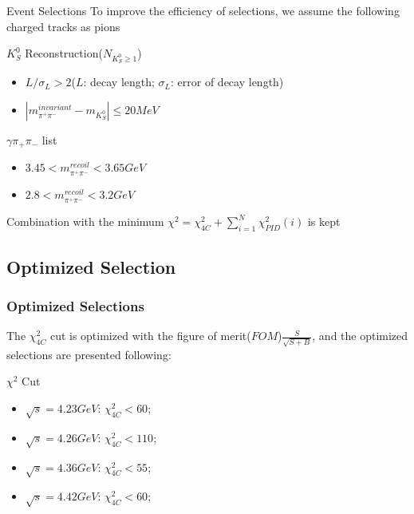 \documentclass{beamer}
\begin{document}
\begin{frame}{Event Selections}
To improve the efficiency of selections, we assume the following charged tracks as pions
\bigskip
\begin{block}{$K^0_S$ Reconstruction($N_{K^0_S \geq 1}$)}
\begin{itemize}
\item $L/\sigma_L > 2$\hspace($L$: decay length; $\sigma_L$: error of decay length)
\item $|m^{invariant}_{\pi^+\pi^-} - m_{K^0_S} | \leq 20 MeV$
\end{itemize}
\end{block}
\begin{block}{$\gamma\pi_+\pi_-$ list}
\begin{itemize}
\item $3.45<m_{\pi^+\pi^-}^{recoil}<3.65 GeV$
\item $2.8<m_{\pi^+\pi^-}^{recoil}<3.2 GeV$
\end{itemize}
\end{block}
\bigskip
Combination with the minimum $\chi^2 = \chi^2_{4C} + \sum^N_{i=1}\chi^2_{PID}(i)$ is kept 
\end{frame}

\subsection{Optimized Selection} %

\begin{frame}
\frametitle{Optimized Selections}
The $\chi^2_{4C}$ cut is optimized with the figure of merit($FOM$)$\frac{S}{\sqrt{S+B}}$,
and the optimized selections are presented following:

\bigskip
\begin{block}{$\chi^2$ Cut}
\begin{itemize}
\item $\sqrt{s} = 4.23 GeV$: $\chi^2_{4C} < 60$;
\item $\sqrt{s} = 4.26 GeV$: $\chi^2_{4C} < 110$;
\item $\sqrt{s} = 4.36 GeV$: $\chi^2_{4C} < 55$;
\item $\sqrt{s} = 4.42 GeV$: $\chi^2_{4C} < 60$;
\end{itemize}
\end{block}

\end{frame}
\end{document}
